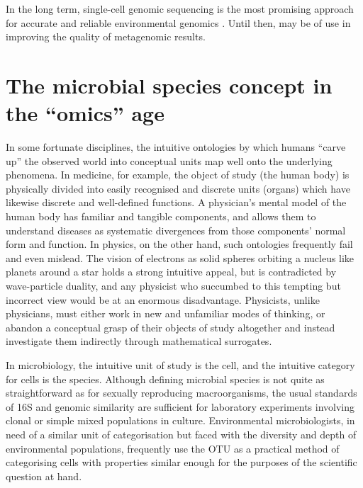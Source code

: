 In the long term, single-cell genomic sequencing is the most promising approach for accurate and reliable environmental genomics \cite{Blainey:2013dp}.
Until then,  may be of use in improving the quality of metagenomic results.

\section{The microbial species concept in the ``omics'' age}

In some fortunate disciplines, the intuitive ontologies by which humans ``carve up'' the observed world into conceptual units map well onto the underlying phenomena.
In medicine, for example, the object of study (the human body) is physically divided into easily recognised and discrete units (organs) which have likewise discrete and well-defined functions.
A physician's mental model of the human body has familiar and tangible components, and allows them to understand diseases as systematic divergences from those components' normal form and function.
In physics, on the other hand, such ontologies frequently fail and even mislead.
The vision of electrons as solid spheres orbiting a nucleus like planets around a star holds a strong intuitive appeal, but is contradicted by wave-particle duality, and any physicist who succumbed to this tempting but incorrect view would be at an enormous disadvantage.
Physicists, unlike physicians, must either work in new and unfamiliar modes of thinking, or abandon a conceptual grasp of their objects of study altogether and instead investigate them indirectly through mathematical surrogates.

In microbiology, the intuitive unit of study is the cell, and the intuitive category for cells is the species.
Although defining microbial species is not quite as straightforward as for sexually reproducing macroorganisms, the usual standards of 16S and genomic similarity are sufficient for laboratory experiments involving clonal or simple mixed populations in culture.
Environmental microbiologists, in need of a similar unit of categorisation but faced with the diversity and depth of environmental populations, frequently use the \ac{OTU} as a practical method of categorising cells with properties similar enough for the purposes of the scientific question at hand.

